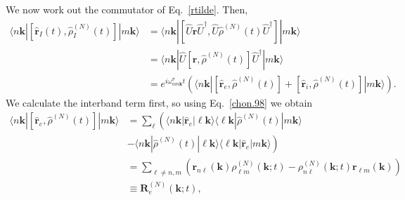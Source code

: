 We now work out the commutator of Eq.~\eqref{rtilde}. Then,
\begin{align}\label{conmu1}
\langle n\mathbf{k}|
[\hat{\mathbf{r}}_I(t),\hat{\rho}^{(N)}_I(t)]
|m\mathbf{k}\rangle
&=
\langle n\mathbf{k}|
[\hat{U}\hat{\mathbf{r}}\hat{U}^\dagger,\hat{U}\hat{\rho}^{(N)}(t)\hat{U}^\dagger]
|m\mathbf{k}\rangle
\nonumber \\
&=
\langle n\mathbf{k}|
\hat{U}[\hat{\mathbf{r}},\hat{\rho}^{(N)}(t)]\hat{U}^\dagger
|m\mathbf{k}\rangle
\\
&=
e^{i\omega^\sigma_{nm\mathbf{k}}t}
\left(
\langle n\mathbf{k}|
[\hat{\mathbf{r}}_e,\hat{\rho}^{(N)}(t)]
+
[\hat{\mathbf{r}}_i,\hat{\rho}^{(N)}(t)]
|m\mathbf{k}\rangle
\right)
\nonumber
.
\end{align}
We calculate the interband term first, so using Eq.~\eqref{chon.98} we obtain
\begin{align}\label{conmu2}
\langle n\mathbf{k}|
[\hat{\mathbf{r}}_e,\hat{\rho}^{(N)}(t)]
|m\mathbf{k}\rangle
&=
\sum_{\ell}
\left(
\langle n\mathbf{k}|
\hat{\mathbf{r}}_e
|\ell\mathbf{k}\rangle
\langle \ell\mathbf{k}|
\hat{\rho}^{(N)}(t)
|m\mathbf{k}\rangle
\right.
\nonumber \\
&
\left.
-
\langle n\mathbf{k}|
\hat{\rho}^{(N)}(t)
|\ell\mathbf{k}\rangle
\langle \ell\mathbf{k}|
\hat{\mathbf{r}}_e
|m\mathbf{k}\rangle
\right)
\nonumber \\
&=
\sum_{\ell\ne n,m}
\left(
\mathbf{r}_{n\ell}(\mathbf{k})
\rho^{(N)}_{\ell m}(\mathbf{k};t)
-
\rho^{(N)}_{n\ell}(\mathbf{k};t)
\mathbf{r}_{\ell m}(\mathbf{k})
\right)
\nonumber\\
&\equiv
\mathbf{R}^{(N)}_e(\mathbf{k};t)
,
\end{align}

